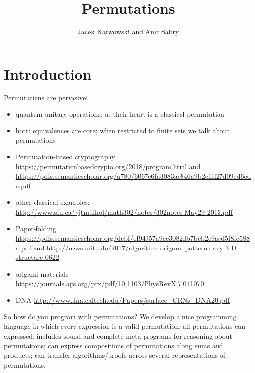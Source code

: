 \documentclass{article}
\title{Permutations}
\author{Jacek Karwowski and Amr Sabry}
\begin{document}
\maketitle

\section{Introduction}

Permutations are pervasive:

\begin{itemize}
  \item quantum unitary operations; at their heart is a classical permutation
  \item hott: equivalences are core; when restricted to finite sets we talk about permutations
  \item Permutation-based cryptography \url{https://permutationbasedcrypto.org/2018/program.html} and \url{https://pdfs.semanticscholar.org/a780/6067e6fa3083ac946a9b2effd27d09ed6cde.pdf}
  \item other classical examples: \url{http://www.sfu.ca/~jtmulhol/math302/notes/302notes-May29-2015.pdf}
  \item Paper-folding \url{https://pdfs.semanticscholar.org/dcbf/ef94957a9cc3082db7bcb2e9aed5f8fc588a.pdf} and \url{http://news.mit.edu/2017/algorithm-origami-patterns-any-3-D-structure-0622}
  \item origami materials \url{https://journals.aps.org/prx/pdf/10.1103/PhysRevX.7.041070}
  \item DNA \url{http://www.dna.caltech.edu/Papers/surface_CRNs_DNA20.pdf}
\end{itemize}

So how do you program with permutations? We develop a nice programming language in which every expression is a valid permutation; all permutations can expressed; includes sound and complete meta-programs for reasoning about permutations; can express compositions of permutations along sums and products; can transfer algorithms/proofs across several representations of permutations.

\end{document}
